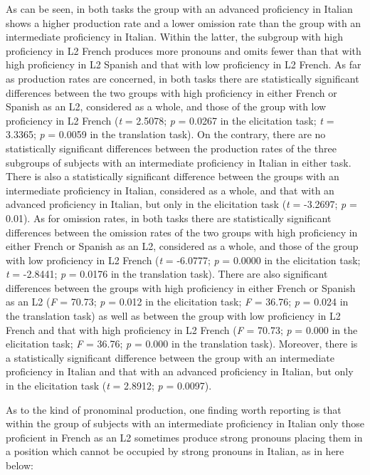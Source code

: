 \documentclass[output=paper,modfonts,nonflat,newtxmath]{langsci/langscibook}
\begin{document}
As can be seen, in both tasks the group with an advanced proficiency in Italian shows a higher production rate and a lower omission rate than the group with an intermediate proficiency in Italian. Within the latter, the subgroup with high proficiency in L2 French produces more pronouns and omits fewer than that with high proficiency in L2 Spanish and that with low proficiency in L2 French. As far as production rates are concerned, in both tasks there are statistically significant differences between the two groups with high proficiency in either French or Spanish as an L2, considered as a whole, and those of the group with low proficiency in L2 French (\textit{t} = 2.5078; \textit{p} = 0.0267 in the elicitation task; \textit{t} = 3.3365; \textit{p} = 0.0059 in the translation task). On the contrary, there are no statistically significant differences between the production rates of the three subgroups of subjects with an intermediate proficiency in Italian in either task. There is also a statistically significant difference between the groups with an intermediate proficiency in Italian, considered as a whole, and that with an advanced proficiency in Italian, but only in the elicitation task (\textit{t} = -3.2697; \textit{p} = 0.01). As for omission rates, in both tasks there are statistically significant differences between the omission rates of the two groups with high proficiency in either French or Spanish as an L2, considered as a whole, and those of the group with low proficiency in L2 French (\textit{t} = -6.0777; \textit{p} = 0.0000 in the elicitation task; \textit{t} = -2.8441; \textit{p} = 0.0176 in the translation task). There are also significant differences between the groups with high proficiency in either French or Spanish as an L2 (\textit{F} = 70.73; \textit{p} = 0.012 in the elicitation task; \textit{F} = 36.76; \textit{p} = 0.024 in the translation task) as well as between the group with low proficiency in L2 French and that with high proficiency in L2 French (\textit{F} = 70.73; \textit{p} = 0.000 in the elicitation task; \textit{F} = 36.76; \textit{p} = 0.000 in the translation task). Moreover, there is a statistically significant difference between the group with an intermediate proficiency in Italian and that with an advanced proficiency in Italian, but only in the elicitation task (\textit{t} = 2.8912; \textit{p} = 0.0097).


As to the kind of pronominal production, one finding worth reporting is that within the group of subjects with an intermediate proficiency in Italian only those proficient in French as an L2 sometimes produce strong pronouns placing them in a position which cannot be occupied by strong pronouns in Italian, as in  here below:
\end{document}
